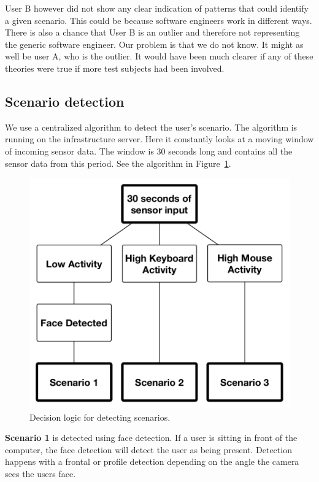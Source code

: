 \documentclass{sigchi}
\begin{document}
User B however did not show any clear indication of patterns that could identify a given scenario.
This could be because software engineers work in different ways.
There is also a chance that User B is an outlier and therefore not representing the generic software engineer.
Our problem is that we do not know.
It might as well be user A, who is the outlier.
It would have been much clearer if any of these theories were true if more test subjects had been involved.

\subsection{Scenario detection}
We use a centralized algorithm to detect the user's scenario.
The algorithm is running on the infrastructure server.
Here it constantly looks at a moving window of incoming sensor data.
The window is 30 seconds long and contains all the sensor data from this period.
See the algorithm in Figure~\ref{fig:decision_logic}.

\begin{figure}[H]
  \centering
  \includegraphics[width=\columnwidth]{figures/decision_logic.pdf}
  \caption{Decision logic for detecting scenarios.}
  \label{fig:decision_logic}
\end{figure}

\textbf{Scenario 1} is detected using face detection.
If a user is sitting in front of the computer, the face detection will detect the user as being present.
Detection happens with a frontal or profile detection depending on the angle the camera sees the users face.
\end{document}
